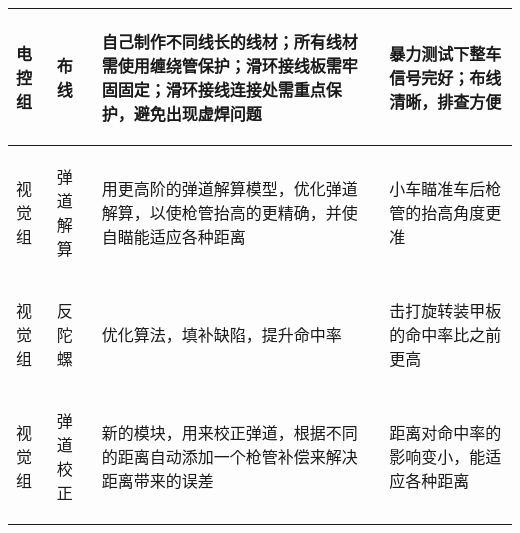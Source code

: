 \begin{longtable}{ p{1.5cm} | p{3cm} | p{6cm} | p{4.3cm} |}
    \hline

       \begin{center}
           电控组
       \end{center} &
       \begin{center}
           布线
       \end{center} &
       \begin{center}
           自己制作不同线长的线材；所有线材需使用缠绕管保护；滑环接线板需牢固固定；滑环接线连接处需重点保护，避免出现虚焊问题
       \end{center} &
       \begin{center}
           暴力测试下整车信号完好；布线清晰，排查方便
       \end{center} \\
        
    \hline

       \begin{center}
           视觉组
       \end{center} &
       \begin{center}
           弹道解算
       \end{center} &
       \begin{center}
           用更高阶的弹道解算模型，优化弹道解算，以使枪管抬高的更精确，并使自瞄能适应各种距离
       \end{center} &
       \begin{center}
           小车瞄准车后枪管的抬高角度更准
       \end{center} \\

    \hline

       \begin{center}
           视觉组
       \end{center} &
       \begin{center}
           反陀螺
       \end{center} &
       \begin{center}
           优化算法，填补缺陷，提升命中率
       \end{center} &
       \begin{center}
           击打旋转装甲板的命中率比之前更高
       \end{center} \\

    \hline

       \begin{center}
           视觉组
       \end{center} &
       \begin{center}
           弹道校正
       \end{center} &
       \begin{center}
           新的模块，用来校正弹道，根据不同的距离自动添加一个枪管补偿来解决距离带来的误差
       \end{center} &
       \begin{center}
           距离对命中率的影响变小，能适应各种距离
       \end{center} \\
    
\end{longtable}
